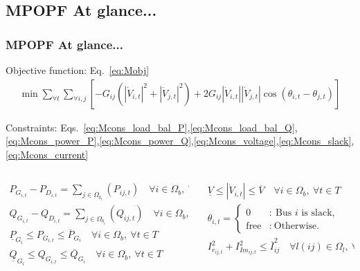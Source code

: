 \documentclass[
	11pt, %
	aspectratio=169, %
]{beamer}
\begin{document}

\subsection{MPOPF At glance...}

\begin{frame}
	\frametitle{MPOPF At glance...}
	\label{frame:MPOFP_atglance}
	
	Objective function: Eq.~\eqref{eq:Mobj}
	\begin{align*}
		\min{ \sum_{\forall t} \sum_{\forall i,j} {[-G_{ij}(\left|\dot{V}_{i,t} \right|^2 + \left|\dot{V}_{j,t} \right|^2) + 2G_{ij}\left|\dot{V}_{i,t} \right|\left|\dot{V}_{j,t} \right|\cos\left(\theta_{i,t}-\theta_{j,t} \right) ]} }
	\end{align*}

	Constraints: Eqs.~\eqref{eq:Mcons_load_bal_P},\eqref{eq:Mcons_load_bal_Q},\eqref{eq:Mcons_power_P},\eqref{eq:Mcons_power_Q},\eqref{eq:Mcons_voltage},\eqref{eq:Mcons_slack},\eqref{eq:Mcons_current}

	\vspace{-0.5em}
	\begin{columns}
		\begin{column}{0.5\textwidth}
			\begin{align*}
				P_{G_{i,t}} - P_{D_{i,t}} = \sum_{j \in \Omega_{b_{i}}}(P_{ij,t})  \quad \forall i \in \Omega_{b},\ \forall t \in T\\
				Q_{G_{i,t}} - Q_{D_{i,t}} = \sum_{j \in \Omega_{b_{i}}}(Q_{ij,t})  \quad \forall i \in \Omega_{b},\ \forall t \in T\\
				\underline{P}_{G_{i}} \leq P_{G_{i,t}} \leq \overline{P}_{G_{i}} \quad \forall i \in \Omega_{b},\ \forall t \in T\\
				\underline{Q}_{G_{i}} \leq Q_{G_{i,t}} \leq \overline{Q}_{G_{i}}  \quad \forall i \in \Omega_{b},\ \forall t \in T\\
			\end{align*}
		\end{column}

		\begin{column}{0.5\textwidth}
			\begin{align*}
				\underline{V} \leq \left|\dot{V}_{i,t} \right| \leq \overline{V}  \quad \forall i \in \Omega_{b},\ \forall t \in T\\
				\theta_{i,t} = \left\{ \begin{array}{cl}
							0 & : \ \text{Bus } i \text{ is slack,} \\
							\text{free} & : \ \text{Otherwise.}
							\end{array} \right.\\
				I_{r_{ij,t}}^{2}+ I_{Im_{ij,t}}^{2} \leq \overline{I}_{ij}^{2} \quad   \forall l(ij) \in \Omega_{l},\ \forall t \in T\\
			\end{align*}
		\end{column}
	\end{columns}
	
\end{frame}
\end{document}
